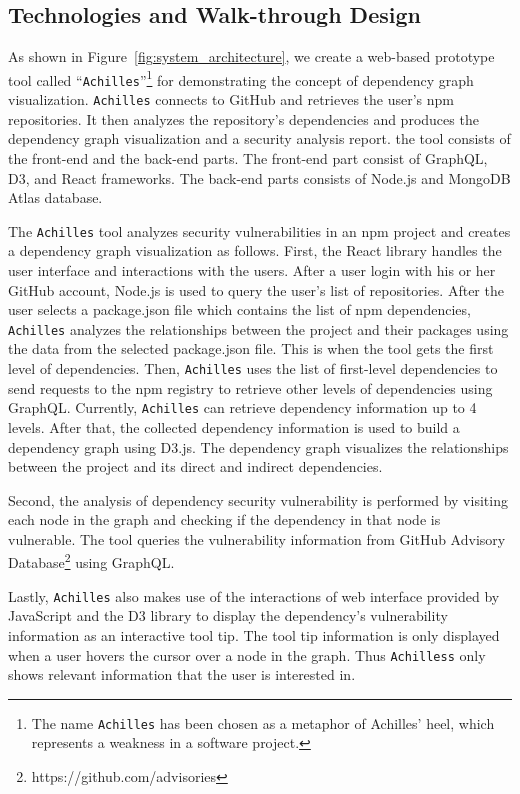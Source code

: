 \documentclass[conference]{IEEEtran}
\begin{document}
	\subsection{Technologies and Walk-through Design}
	
	As shown in Figure~\ref{fig:system_architecture}, we create a web-based prototype tool called ``\texttt{Achilles}''\footnote{The name \texttt{Achilles} has been chosen as a metaphor of Achilles' heel, which represents a weakness in a software project.} for demonstrating the concept of dependency graph visualization. \texttt{Achilles} connects to GitHub and retrieves the user's npm repositories. It then analyzes the repository's dependencies and produces the dependency graph visualization and a security analysis report.  the tool consists of the front-end and the back-end parts. The front-end part consist of GraphQL, D3, and React frameworks. The back-end parts consists of Node.js and MongoDB Atlas database.
	
	The \texttt{Achilles} tool analyzes security vulnerabilities in an npm project and creates a dependency graph visualization as follows.
	First, the React library handles the user interface and interactions with the users. After a user login with his or her GitHub account, Node.js is used to query the user's list of repositories. After the user selects a package.json file which contains the list of npm dependencies, \texttt{Achilles} analyzes the relationships between the project and their packages using the data from the selected package.json file. This is when the tool gets the first level of dependencies. Then, \texttt{Achilles}  uses the list of first-level dependencies to send requests to the npm registry to retrieve other levels of dependencies using GraphQL. Currently, \texttt{Achilles} can retrieve dependency information up to 4 levels.
	After that, the collected dependency information is used to build a dependency graph using D3.js. The dependency graph visualizes the relationships between the project and its direct and indirect dependencies.
	
	Second, the analysis of dependency security vulnerability is performed by visiting each node in the graph and checking if the dependency in that node is vulnerable. The tool queries the vulnerability information from GitHub Advisory Database\footnote{https://github.com/advisories} using GraphQL. 
	
	Lastly, \texttt{Achilles} also makes use of the interactions of web interface provided by JavaScript and the D3 library to display the dependency's vulnerability information as an interactive tool tip. The tool tip information is only displayed when a user hovers the cursor over a node in the graph.
	Thus \texttt{Achilless} only shows relevant information that the user is interested in. 
	
\end{document}
